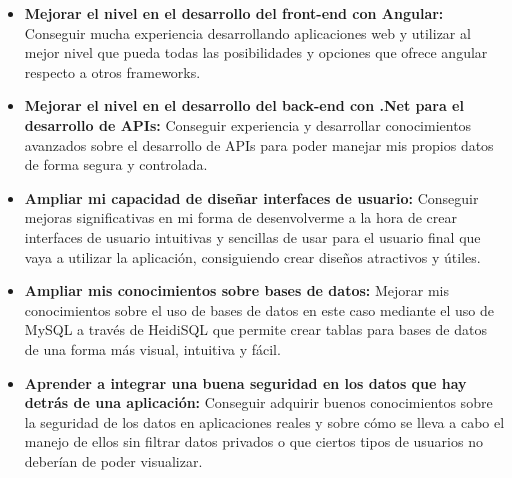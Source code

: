 \begin{itemize}
\tightlist
\item
\textbf{Mejorar el nivel en el desarrollo del front-end con Angular:} Conseguir mucha experiencia desarrollando aplicaciones web y utilizar al mejor nivel que pueda todas las posibilidades y opciones que ofrece angular respecto a otros frameworks.

\item
\textbf{Mejorar el nivel en el desarrollo del back-end con .Net para el desarrollo de APIs:} Conseguir experiencia y desarrollar conocimientos avanzados sobre el desarrollo de APIs para poder manejar mis propios datos de forma segura y controlada.

\item
\textbf{Ampliar mi capacidad de diseñar interfaces de usuario:} Conseguir mejoras significativas en mi forma de desenvolverme a la hora de crear interfaces de usuario intuitivas y sencillas de usar para el usuario final que vaya a utilizar la aplicación, consiguiendo crear diseños atractivos y útiles.

\item
\textbf{Ampliar mis conocimientos sobre bases de datos:} Mejorar mis conocimientos sobre el uso de bases de datos en este caso mediante el uso de MySQL a través de HeidiSQL que permite crear tablas para bases de datos de una forma más visual, intuitiva y fácil.

\item
\textbf{Aprender a integrar una buena seguridad en los datos que hay detrás de una aplicación:} Conseguir adquirir buenos conocimientos sobre la seguridad de los datos en aplicaciones reales y sobre cómo se lleva a cabo el manejo de ellos sin filtrar datos privados o que ciertos tipos de usuarios no deberían de poder visualizar.
\end{itemize}